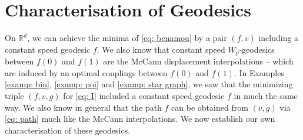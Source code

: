 \documentclass[conference]{IEEEtran}
\theoremstyle{ieeestyle}
\begin{document}
\section{Characterisation of Geodesics}\label{sec: 4}
On $\mathbb{R}^d$, we can achieve the minima of \eqref{eq: benamou} by a pair $(f,v)$ including a constant speed geodesic $f$. We also know that constant speed $W_p$-geodesics between $f(0)$ and $f(1)$ are the McCann displacement interpolations -- which are induced by an optimal couplings between $f(0)$ and $f(1)$.
\newline\newline
In Examples \ref{examp: bin}, \ref{examp: poi} and \ref{examp: star graph}, we saw that the minimizing triple $(f,v,g)$ for \eqref{eq: I} included a constant speed geodesic $f$ in much the same way. We also know in general that the path $f$ can be obtained from $(v,g)$ via \eqref{eq: path} much like the McCann interpolations. We now establish our own characterisation of these geodesics.
\end{document}
